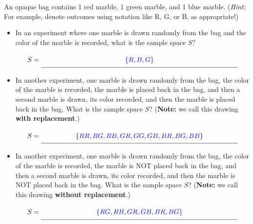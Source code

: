 \documentclass[10pt]{article}
\begin{document}
 An opaque bag contains 1 {\color{red}red} marble, 1 {\color{ForestGreen}green} marble, and 1 {\color{blue}blue} marble. ({\it Hint:} For example, denote outcomes using notation like {\color{red}R}, {\color{ForestGreen}G}, or {\color{blue}B}, as appropriate!)
    \begin{itemize}
    \item[(a)] In an experiment where one marble is drawn randomly from the bag and the color of the marble is recorded, what is the sample space $S$?

    {\Large
    \[
    S =\unlineb{4}{\{R,B,G\}}
    \]
    }

    \item[(b)] In another experiment, one marble is drawn randomly from the bag, the color of the marble is recorded, the marble is placed back in the bag, and then a second marble is drawn, its color recorded, and then the marble is placed back in the bag. What is the sample space $S$? ({\bf Note:} we call this drawing {\bf with replacement}.)

    {\Large
    \[
    S = \unlineb{4}{\{RR,RG,RB,GR,GG,GB,BR,BG,BB\}}
    \]
    }

    \item[(c)] In another experiment, one marble is drawn randomly from the bag, the color of the marble is recorded, the marble is NOT placed back in the bag, and then a second marble is drawn, its color recorded, and then the marble is NOT placed back in the bag. What is the sample space $S$? ({\bf Note:} we call this drawing {\bf without replacement}.)

    {\Large
    \[
    S = \unlineb{4}{\{RG,RB,GR,GB,BR,BG\}}
    \]
    }
    
    \end{itemize}

\newpage%
\end{document}

